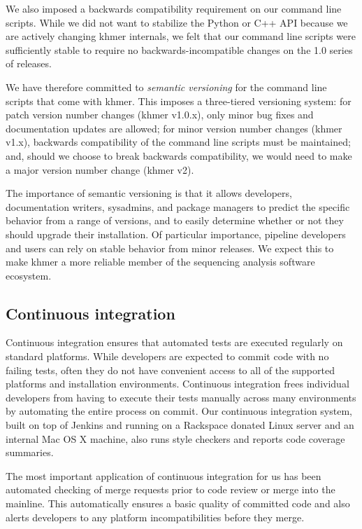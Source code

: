 \documentclass[11pt]{article}
\begin{document}
We also imposed a backwards compatibility requirement on our command
line scripts.  While we did not want to stabilize the Python or C++
API because we are actively changing khmer internals, we felt that
our command line scripts were sufficiently stable to require no
backwards-incompatible changes on the 1.0 series of releases.

We have therefore committed to {\em semantic versioning}\cite{semver} for the
command line scripts that come with khmer.  This imposes a
three-tiered versioning system: for patch version number changes
(khmer v1.0.x), only minor bug fixes and documentation updates are
allowed; for minor version number changes (khmer v1.x), backwards
compatibility of the command line scripts must be maintained; and,
should we choose to break backwards compatibility, we would need to
make a major version number change (khmer v2).

The importance of semantic versioning is that it allows developers,
documentation writers, sysadmins, and package managers to predict the
specific behavior from a range of versions, and to easily determine
whether or not they should upgrade their installation.  Of particular
importance, pipeline developers and users can rely on stable behavior
from minor releases.  We expect this to make khmer a more reliable
member of the sequencing analysis software ecosystem.

\subsection{Continuous integration}

Continuous integration ensures that automated tests are executed
regularly on standard platforms.  While developers are expected to
commit code with no failing tests, often they do not have convenient
access to all of the supported platforms and installation
environments.  Continuous integration frees individual developers from
having to execute their tests manually across many environments by
automating the entire process on commit.  Our continuous integration
system, built on top of Jenkins and running on a Rackspace donated
Linux server and an internal Mac OS X machine, also runs style
checkers and reports code coverage summaries.

The most important application of continuous integration for us has
been automated checking of merge requests prior to code review or
merge into the mainline.  This automatically ensures a basic quality
of committed code and also alerts developers to any platform
incompatibilities before they merge.
\end{document}
